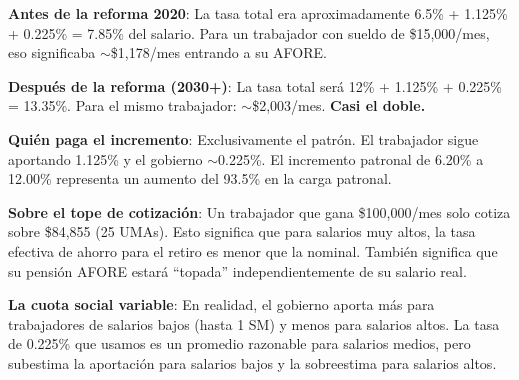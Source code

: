 \documentclass[11pt,a4paper]{report}
\begin{document}
\begin{tcolorbox}[colback=green!5!white, colframe=green!50!black, title=\textbf{Intuici\'on}]
\textbf{Antes de la reforma 2020}: La tasa total era aproximadamente 6.5\% + 1.125\% + 0.225\% = 7.85\% del salario. Para un trabajador con sueldo de \$15,000/mes, eso significaba $\sim$\$1,178/mes entrando a su AFORE.

\textbf{Despu\'es de la reforma (2030+)}: La tasa total ser\'a 12\% + 1.125\% + 0.225\% = 13.35\%. Para el mismo trabajador: $\sim$\$2,003/mes. \textbf{Casi el doble.}

\textbf{Qui\'en paga el incremento}: Exclusivamente el patr\'on. El trabajador sigue aportando 1.125\% y el gobierno $\sim$0.225\%. El incremento patronal de 6.20\% a 12.00\% representa un aumento del 93.5\% en la carga patronal.

\textbf{Sobre el tope de cotizaci\'on}: Un trabajador que gana \$100,000/mes solo cotiza sobre \$84,855 (25 UMAs). Esto significa que para salarios muy altos, la tasa efectiva de ahorro para el retiro es menor que la nominal. Tambi\'en significa que su pensi\'on AFORE estar\'a ``topada'' independientemente de su salario real.

\textbf{La cuota social variable}: En realidad, el gobierno aporta m\'as para trabajadores de salarios bajos (hasta 1 SM) y menos para salarios altos. La tasa de 0.225\% que usamos es un promedio razonable para salarios medios, pero subestima la aportaci\'on para salarios bajos y la sobreestima para salarios altos.
\end{tcolorbox}
\end{document}
